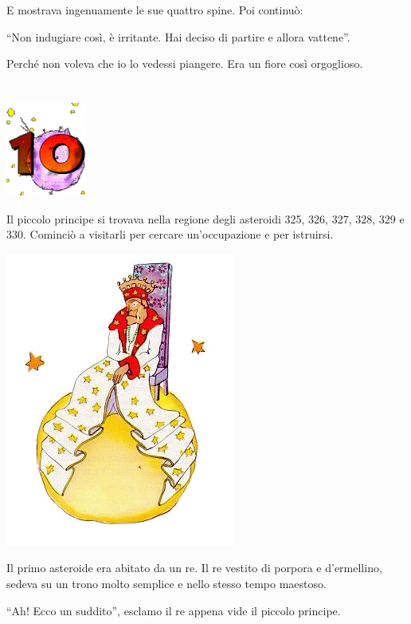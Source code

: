 \documentclass[11pt]{scrbook}
\begin{document}
E mostrava ingenuamente le sue quattro spine. Poi continuò:

``Non indugiare così, è irritante. Hai deciso di partire e allora vattene''.

Perché non voleva che io lo vedessi piangere. Era un fiore così orgoglioso.

\chapter{}
\begin{center}
\includegraphics{img/chapter10}
\end{center}

Il piccolo principe si trovava nella regione degli asteroidi 325, 326, 327, 328, 329 e 330. Cominciò a visitarli per cercare un'occupazione e per istruirsi.

\begin{center}
\includegraphics{img/10a}
\end{center}

Il primo asteroide era abitato da un re. Il re vestito di porpora e d'ermellino, sedeva su un trono molto semplice e nello stesso tempo maestoso.

``Ah! Ecco un suddito'', esclamo il re appena vide il piccolo principe.
\end{document}
